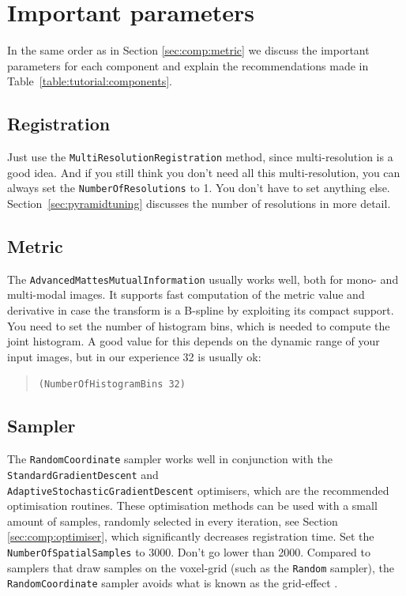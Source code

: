 \documentclass[]{report}
\begin{document}
\section{Important parameters}\label{sec:Tutorial:importantparam}

In the same order as in Section \ref{sec:comp:metric} we discuss
the important parameters for each component and explain the
recommendations made in Table~\ref{table:tutorial:components}.

\subsection{Registration}\label{sec:registrationtuning}

Just use the \texttt{MultiResolutionRegistration} method, since
multi-resolution is a good idea. And if you still think you don't
need all this multi-resolution, you can always set the
\texttt{NumberOfResolutions} to 1. You don't have to set anything
else. Section~\ref{sec:pyramidtuning} discusses the number of
resolutions in more detail.

\subsection{Metric}

The \texttt{AdvancedMattesMutualInformation} usually works well,
both for mono- and multi-modal images. It supports fast computation
of the metric value and derivative in case the transform is a
B-spline by exploiting its compact support. You need to set the
number of histogram bins, which is needed to compute the joint
histogram. A good value for this depends on the dynamic range of
your input images, but in our experience 32 is usually ok:
\begin{quote}
\texttt{(NumberOfHistogramBins 32)}
\end{quote}

\subsection{Sampler}\label{sec:samplertuning}

The \texttt{RandomCoordinate} sampler works well in conjunction with
the \texttt{StandardGradientDescent} and\\
\texttt{AdaptiveStochasticGradientDescent} optimisers, which are the
recommended optimisation routines. These optimisation methods can be
used with a small amount of samples, randomly selected in every
iteration, see Section \ref{sec:comp:optimiser}, which significantly
decreases registration time. Set the \texttt{NumberOfSpatialSamples}
to 3000. Don't go lower than 2000. Compared to samplers that draw
samples on the voxel-grid (such as the \texttt{Random} sampler), the
\texttt{RandomCoordinate} sampler avoids what is known as the
grid-effect \citep{The08:Halton}.
\end{document}
